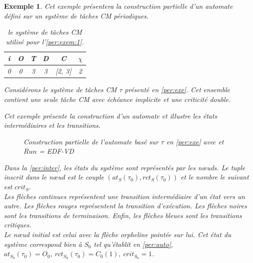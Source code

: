 \documentclass[12pt,a4paper,oneside]{book}
\theoremstyle{break}
\newtheorem{exem}{Exemple}[chapter]
\theoremstyle{breakplain}
\begin{document}
\begin{exem}
\label{per:exem:1}
Cet exemple présentera la construction partielle d'un automate défini sur un système de tâches CM périodiques.
\begin{table}[h]
    \centering
\begin{tabular}{|c|c|c|c|c|c|}
\hline
i &O & T & D & C & $\chi$\\
\hline
0 & 0 & 3 & 3 & [2, 3]& 2\\
\hline
\end{tabular}
    
\caption{le système de tâches CM utilisé pour l'\autoref{per:exem:1}.}
\label{per:exe}
\end{table}

Considérons le système de tâches CM $\tau$ présenté en \autoref{per:exe}. Cet ensemble contient une seule tâche CM avec échéance implicite et une criticité double.

Cet exemple présente la construction d'un automate et illustre les états intermédiaires et les transitions.\\
\begin{figure}[h]
    \centering
    \resizebox{\textwidth}{!}{
    \fontsize{28pt}{12pt}\selectfont
    
    }
    
\caption{Construction partielle de l'automate basé sur $\tau$ en \autoref{per:exe} avec et $Run$ = \textit{EDF-VD}}
\label{per:inter}
\end{figure}

Dans la \autoref{per:inter}, les états du système sont représentés par les nœuds. Le tuple inscrit dans le nœud est le couple $(at_S(\tau_0), rct_S(\tau_0))$ et le nombre le suivant est $crit_S$.\\
Les flèches continues représentent une transition intermédiaire d'un état vers un autre. Les flèches rouges représentent la transition d'exécution. Les flèches noires sont les transitions de terminaison. Enfin, les flèches bleues sont les transitions critiques.\\

Le nœud initial est celui avec la flèche orpheline pointée sur lui. Cet état du système correspond bien à $S_0$ tel qu'établit en \autoref{per:auto}, $at_{S_0}(\tau_0) = O_0,\ rct_{S_0}(\tau_0) = C_0(1),\ crit_{S_0} = 1$.\\


\end{exem}
\end{document}
